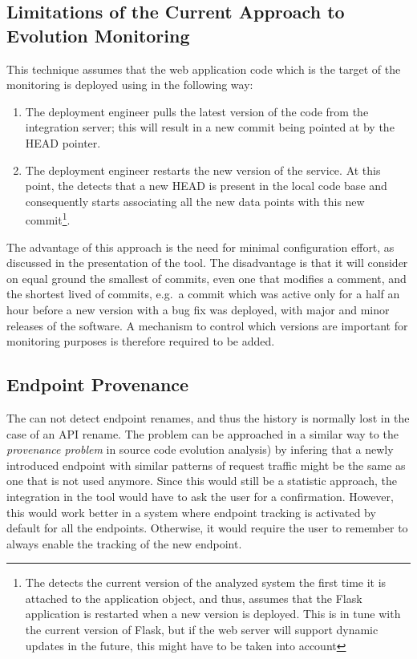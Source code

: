   \subsection*{Limitations of the Current Approach to Evolution Monitoring}

    This technique assumes that the web application code which is the target of the monitoring is deployed using \git in the following way: 

    \begin{enumerate}
      \item The deployment engineer pulls the latest version of the code from the integration server; this will result in a new commit being pointed at by the HEAD pointer. %
      \item The deployment engineer restarts the new version of the service. At this point, the \tool detects that a new HEAD is present in the local code base and consequently starts associating all the new data points with this new commit\footnote{The \tool detects the current version of the analyzed system the first time it is attached to the application object, and thus, assumes that the Flask application is restarted when a new version is deployed. This is in tune with the current version of Flask, but if the web server will support dynamic updates in the future, this might have to be taken into account}.
    \end{enumerate}

      The advantage of this approach is the need for minimal configuration effort, as discussed in the presentation of the tool. The disadvantage is that it will consider on equal ground the smallest of commits, even one that modifies a comment, and the shortest lived of commits, e.g.~a commit which was active only for a half an hour before a new version with a bug fix was deployed, with major and minor releases of the software. %
    A mechanism to control which versions are important for monitoring purposes is therefore required to be added.


  \subsection*{Endpoint Provenance }

    The \tool can not detect endpoint renames, and thus the history is normally lost in the case of an API rename. The problem can be approached in a similar way to the {\em provenance problem} in source code evolution analysis)\cite{Davi11a} by infering that a newly introduced endpoint with similar patterns of request traffic might be the same as one that is not used anymore. Since this would still be a statistic approach, the integration in the tool would have to ask the user for a confirmation. 
    However, this would work better in a system where endpoint tracking is activated by default for all the endpoints. Otherwise, it would require the user to remember to always enable the tracking of the new endpoint. 


